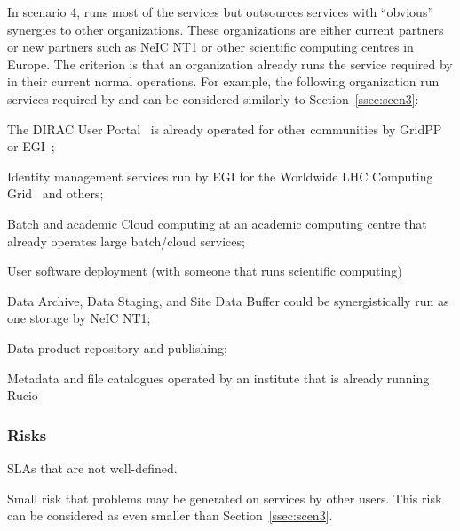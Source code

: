 \documentclass[12pt,a4paper]{article}
\newcommand{\nnt}{NeIC NT1\xspace}
\begin{document}
In scenario 4, \EC runs most of the services but outsources services with ``obvious'' synergies to other organizations.
These organizations are either current \EC partners or new partners such as \nnt or other scientific computing centres in Europe.
The criterion is that an organization already runs the service required by \ED in their current normal operations. 
For example, the following organization run services required by \ED and can be considered similarly to Section~\ref{ssec:scen3}:
\bitm
  \item The DIRAC User Portal~\cite{dirac} is already operated for other communities by GridPP~\cite{gridpp-dirac} or EGI~\cite{egi};
  \item Identity management services run by EGI for the Worldwide LHC Computing Grid~\cite{wlcg} and others;
  \item Batch and academic Cloud computing at an academic computing centre that already operates large batch/cloud services;
  \item User software deployment (with someone that runs scientific computing)
  \item Data Archive, Data Staging, and Site Data Buffer could be synergistically run as one storage by NeIC NT1;
  \item Data product repository and publishing;
  \item Metadata and file catalogues operated by an institute that is already running Rucio~\cite{rucio}
\eitm
  
\subsubsection*{Risks}
\bitm
  \item SLAs that are not well-defined. 
  \item {Small risk that problems may be generated on services by other    users. This risk can be considered as even smaller than Section~\ref{ssec:scen3}.}
\eitm
\end{document}
